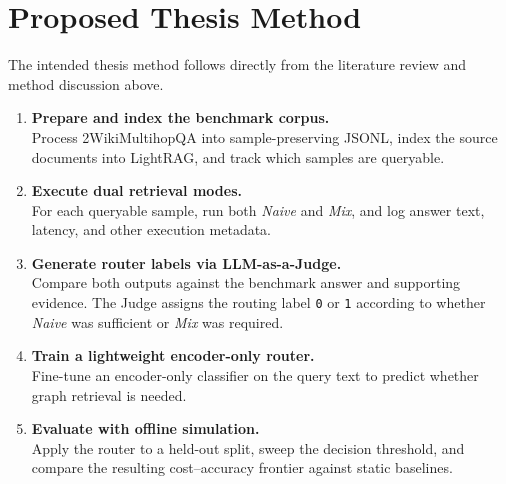 \documentclass[11pt, a4paper]{article}
\begin{document}
\section{Proposed Thesis Method}

The intended thesis method follows directly from the literature review and method discussion above.

\begin{enumerate}[leftmargin=*, label=\textbf{\arabic*.}]
    \item \textbf{Prepare and index the benchmark corpus.} \\
    Process 2WikiMultihopQA into sample-preserving JSONL, index the source documents into LightRAG, and track which samples are queryable.

    \item \textbf{Execute dual retrieval modes.} \\
    For each queryable sample, run both \emph{Naive} and \emph{Mix}, and log answer text, latency, and other execution metadata.

    \item \textbf{Generate router labels via LLM-as-a-Judge.} \\
    Compare both outputs against the benchmark answer and supporting evidence. The Judge assigns the routing label \texttt{0} or \texttt{1} according to whether \emph{Naive} was sufficient or \emph{Mix} was required.

    \item \textbf{Train a lightweight encoder-only router.} \\
    Fine-tune an encoder-only classifier on the query text to predict whether graph retrieval is needed.

    \item \textbf{Evaluate with offline simulation.} \\
    Apply the router to a held-out split, sweep the decision threshold, and compare the resulting cost--accuracy frontier against static baselines.
\end{enumerate}
\end{document}

